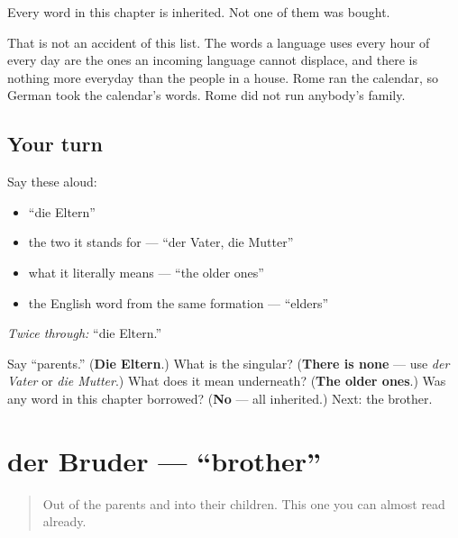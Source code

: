 \begin{culture}
Every word in this chapter is inherited. Not one of them was bought.

That is not an accident of this list. The words a language uses every hour of every day are the ones an incoming language cannot displace, and there is nothing more everyday than the people in a house. Rome ran the calendar, so German took the calendar's words. Rome did not run anybody's family.
\end{culture}

\subsection*{Your turn}
Say these aloud:

\begin{itemize}
\raggedright
  \item \textquotedblleft{}die Eltern\textquotedblright{}
  \item the two it stands for — \textquotedblleft{}der Vater, die Mutter\textquotedblright{}
  \item what it literally means — \textquotedblleft{}the older ones\textquotedblright{}
  \item the English word from the same formation — \textquotedblleft{}elders\textquotedblright{}
\end{itemize}

\emph{Twice through:} \textquotedblleft{}die Eltern.\textquotedblright{}

\begin{tcolorbox}[breakable,colback=teal!4,colframe=teal!35!black,title={Before you move on}]
Say \textquotedblleft{}parents.\textquotedblright{} (\textbf{Die Eltern}.) What is the singular? (\textbf{There is none} — use \emph{der Vater} or \emph{die Mutter}.) What does it mean underneath? (\textbf{The older ones}.) Was any word in this chapter borrowed? (\textbf{No} — all inherited.) Next: the brother.
\end{tcolorbox}
\section[der Bruder]{der Bruder — \textquotedblleft{}brother\textquotedblright{}}

\label{lesson:GE-C10-bruder}



\begin{quote}
Out of the parents and into their children. This one you can almost read already.
\end{quote}

